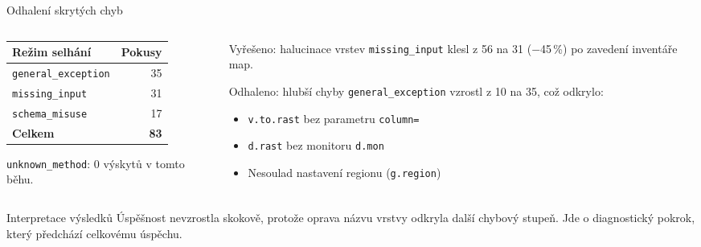 \documentclass[aspectratio=169,11pt]{beamer}
\begin{document}
\begin{frame}[t]{Odhalení skrytých chyb}
  \small
  \begin{columns}[T,onlytextwidth]
    \begin{column}{0.46\textwidth}
      \begin{table}
        \centering
        \begin{tabular}{@{}lr@{}}
          \toprule
          \textbf{Režim selhání} & \textbf{Pokusy} \\
          \midrule
          \texttt{general\_exception} & 35 \\
          \texttt{missing\_input} & 31 \\
          \texttt{schema\_misuse} & 17 \\
          \midrule
          \textbf{Celkem} & \textbf{83} \\
          \bottomrule
        \end{tabular}
      \end{table}

      {\scriptsize \texttt{unknown\_method}: 0 výskytů v tomto běhu.}
    \end{column}

    \begin{column}{0.52\textwidth}
      \begin{block}{Vyřešeno: halucinace vrstev}
        \texttt{missing\_input} klesl z 56 na 31 ($-$45\,\%) po zavedení
        inventáře map.
      \end{block}

      \begin{block}{Odhaleno: hlubší chyby}
        \texttt{general\_exception} vzrostl z 10 na 35, což odkrylo:
        \begin{itemize}
          \item \texttt{v.to.rast} bez parametru \texttt{column=}
          \item \texttt{d.rast} bez monitoru \texttt{d.mon}
          \item Nesoulad nastavení regionu (\texttt{g.region})
        \end{itemize}
      \end{block}
    \end{column}
  \end{columns}

  \begin{alertblock}{Interpretace výsledků}
    Úspěšnost nevzrostla skokově, protože oprava názvu vrstvy odkryla další
    chybový stupeň. Jde o diagnostický pokrok, který předchází celkovému úspěchu.
  \end{alertblock}
\end{frame}
\end{document}
